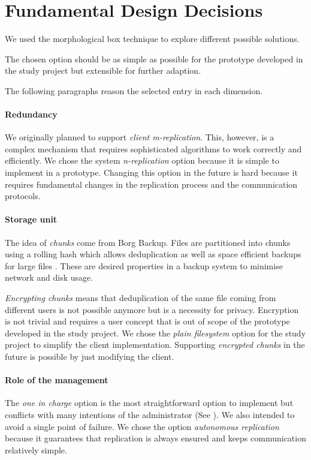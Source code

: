 \section{Fundamental Design Decisions} %

We used the morphological box technique to explore different possible solutions.

The chosen option should be as simple as possible for the prototype developed in the study project but extensible for further adaption.

The following paragraphs reason the selected entry in each dimension.

\paragraph{Redundancy} 
We originally planned to support \emph{client m-replication}. This, however, is a complex mechanism that requires sophisticated algorithms to work correctly and efficiently. We chose the system \emph{n-replication} option because it is simple to implement in a prototype. Changing this option in the future is hard because it requires fundamental changes in the replication process and the communication protocols.

\paragraph{Storage unit}
The idea of \emph{chunks} come from Borg Backup. Files are partitioned into chunks using a rolling hash which allows deduplication as well as space efficient backups for large files \cite{borg-data-structures}. These are desired properties in a backup system to minimise network and disk usage.

\emph{Encrypting chunks} means that deduplication of the same file coming from different users is not possible anymore but is a necessity for privacy. Encryption is not trivial and requires a user concept that is out of scope of the prototype developed in the study project.
We chose the \emph{plain filesystem} option for the study project to simplify the client implementation. Supporting \emph{encrypted chunks} in the future is possible by just modifying the client.

\paragraph{Role of the management}
The \emph{one in charge} option is the most straightforward option to implement but conflicts with many intentions of the administrator (See ). We also intended to avoid a single point of failure. We chose the option \emph{autonomous replication} because it guarantees that replication is always ensured and keeps communication relatively simple.

